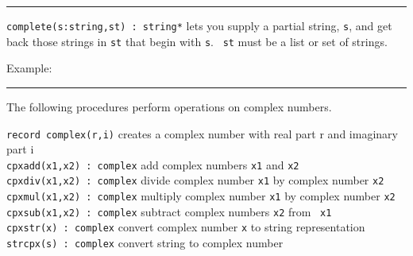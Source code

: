 \vspace{0.25cm}\hrule{}

\texttt{complete(s:string,st) : string*} lets you
supply a partial string, \texttt{s}, and get back those strings in
\texttt{st} that begin with \texttt{s}. \ \texttt{st} must be a list or
set of strings.

Example:


\vspace{0.25cm}\hrule{}

The following procedures perform operations on complex numbers. 

\noindent \texttt{record complex(r,i)} creates a complex number with real part r
and imaginary part i\\
\texttt{cpxadd(x1,x2) : complex} add complex numbers \texttt{x1} and
\texttt{x2}\\
\texttt{cpxdiv(x1,x2) : complex} divide complex number \texttt{x1} by
complex number \texttt{x2}\\
\texttt{cpxmul(x1,x2) : complex} multiply complex number \texttt{x1} by
complex number \texttt{x2}\\
\texttt{cpxsub(x1,x2) : complex} subtract complex numbers \texttt{x2}
from \ \texttt{x1}\\
\texttt{cpxstr(x) : complex} convert complex number \texttt{x} to string
representation\\
\texttt{strcpx(s) : complex} convert string to complex number 

